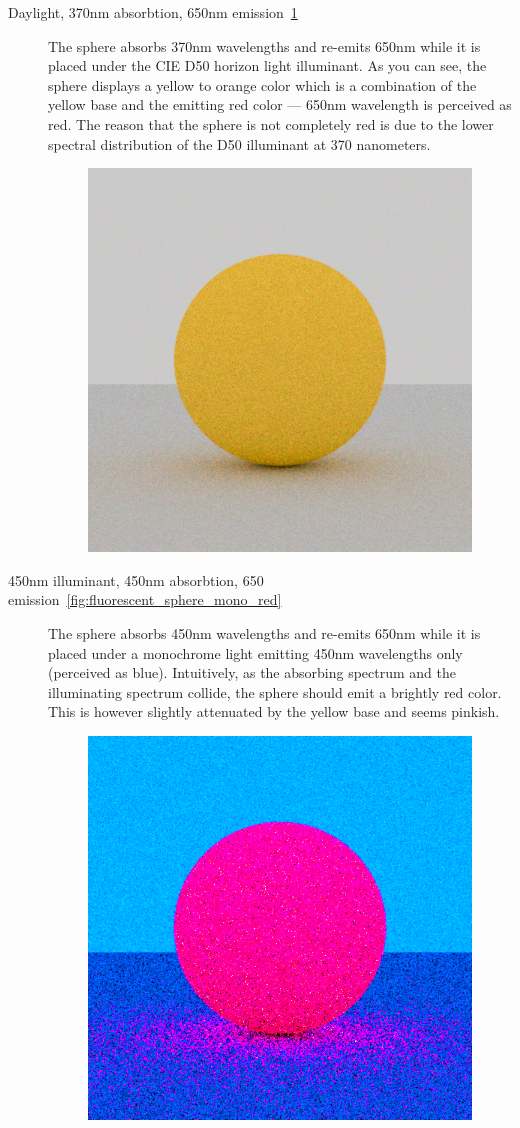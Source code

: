 \begin{description}
	\item[Daylight, 370nm absorbtion, 650nm emission~\ref{fig:fluorescence_d50_red}] The sphere absorbs 370nm wavelengths and re-emits 650nm while it is placed under the CIE D50 horizon light illuminant. As you can see, the sphere displays a yellow to orange color which is a combination of the yellow base and the emitting red color --- 650nm wavelength is perceived as red. The reason that the sphere is not completely red is due to the lower spectral distribution of the D50 illuminant at 370 nanometers.
	\begin{figure}[H]
		\centering
		\includegraphics[width=.6\linewidth]{img/fluorescent_sphere_D50_red.png}
		\caption{}
		\label{fig:fluorescence_d50_red}
	\end{figure}
	\item[450nm illuminant, 450nm absorbtion, 650 emission~\ref{fig:fluorescent_sphere_mono_red}] The sphere absorbs 450nm wavelengths and re-emits 650nm while it is placed under a monochrome light emitting 450nm wavelengths only (perceived as blue). Intuitively, as the absorbing spectrum and the illuminating spectrum collide, the sphere should emit a brightly red color. This is however slightly attenuated by the yellow base and seems pinkish.
	\begin{figure}[H]
		\centering
		\includegraphics[width=.6\linewidth]{img/fluorescent_sphere_mono_red.png}

\end{figure}
\end{description}
